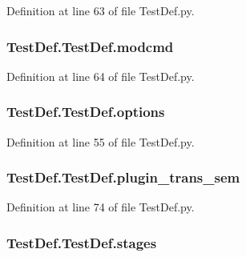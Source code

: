 Definition at line 63 of file Test\-Def.\-py.

\hypertarget{class_test_def_1_1_test_def_af6c1e9ceaf9d8e747bbb57af3bd33198}{
\subsubsection[{modcmd}]{\setlength{\rightskip}{0pt plus 5cm}Test\-Def.\-Test\-Def.\-modcmd}}\label{class_test_def_1_1_test_def_af6c1e9ceaf9d8e747bbb57af3bd33198}


Definition at line 64 of file Test\-Def.\-py.

\hypertarget{class_test_def_1_1_test_def_a7c7d587995154a9f31607dc4726d3a2a}{
\subsubsection[{options}]{\setlength{\rightskip}{0pt plus 5cm}Test\-Def.\-Test\-Def.\-options}}\label{class_test_def_1_1_test_def_a7c7d587995154a9f31607dc4726d3a2a}


Definition at line 55 of file Test\-Def.\-py.

\hypertarget{class_test_def_1_1_test_def_ac4a745e8b2151d1eed56e04770562eb9}{
\subsubsection[{plugin\-\_\-trans\-\_\-sem}]{\setlength{\rightskip}{0pt plus 5cm}Test\-Def.\-Test\-Def.\-plugin\-\_\-trans\-\_\-sem}}\label{class_test_def_1_1_test_def_ac4a745e8b2151d1eed56e04770562eb9}


Definition at line 74 of file Test\-Def.\-py.

\hypertarget{class_test_def_1_1_test_def_a9e15c13bd0cc9b1567c94f847118432e}{
\subsubsection[{stages}]{\setlength{\rightskip}{0pt plus 5cm}Test\-Def.\-Test\-Def.\-stages}}\label{class_test_def_1_1_test_def_a9e15c13bd0cc9b1567c94f847118432e}


